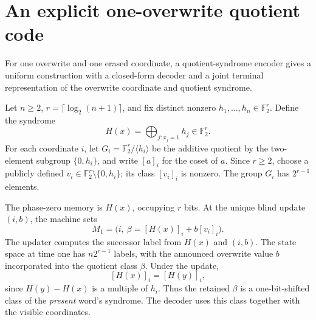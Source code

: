 \documentclass[11pt,a4paper]{article}
\newcommand{\F}{\mathbb F_2}
\begin{document}
\section{An explicit one-overwrite quotient code}\label{sec:one}
For one overwrite and one erased coordinate, a quotient-syndrome encoder gives a uniform construction with a closed-form decoder and a joint terminal representation of the overwrite coordinate and quotient syndrome.

Let $n\ge2$, $r=\lceil\log_2(n+1)\rceil$, and fix distinct nonzero $h_1,\dots,h_n\in\F^r$. Define the syndrome
\[
H(x)=\bigoplus_{j:x_j=1}h_j\in\F^r.
\]
For each coordinate $i$, let $G_i=\F^r/\langle h_i\rangle$ be the additive quotient by the two-element subgroup $\{0,h_i\}$, and write $[a]_i$ for the coset of $a$. Since $r\ge2$, choose a publicly defined $v_i\in\F^r\setminus\{0,h_i\}$; its class $[v_i]_i$ is nonzero. The group $G_i$ has $2^{r-1}$ elements.

The phase-zero memory is $H(x)$, occupying $r$ bits. At the unique blind update $(i,b)$, the machine sets
\begin{equation}\label{eq:oneupdate}
 M_1=\big(i,\ \beta=[H(x)]_i+b[v_i]_i\big).
\end{equation}
The updater computes the successor label from $H(x)$ and $(i,b)$. The state space at time one has $n2^{r-1}$ labels, with the announced overwrite value $b$ incorporated into the quotient class $\beta$. Under the update,
\[
[H(x)]_i=[H(y)]_i,
\]
since $H(y)-H(x)$ is a multiple of $h_i$. Thus the retained $\beta$ is a one-bit-shifted class of the \emph{present} word's syndrome. The decoder uses this class together with the visible coordinates.
\end{document}
